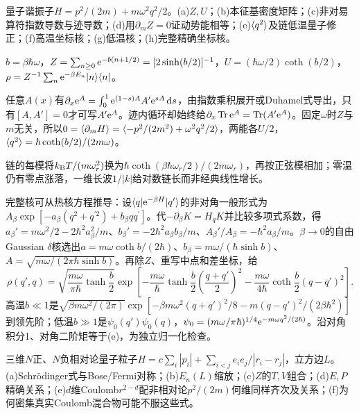 \begin{exercise}[原题8(a)--(h)]\label{r:333-3-8}
量子谐振子$H=p^2/(2m)+m\omega^2q^2/2$。(a)$Z,U$；(b)本征基密度矩阵；(c)非对易算符指数导数与迹导数；(d)用$\partial_mZ=0$证动势能相等；(e)$\langle q^2\rangle$及链低温量子修正；(f)高温坐标核；(g)低温核；(h)完整精确坐标核。
\end{exercise}
\begin{solution}
$b=\beta\hbar\omega$，$Z=\sum_{n\ge0}\mathrm e^{-b(n+1/2)}=[2\sinh(b/2)]^{-1}$，$U=(\hbar\omega/2)\coth(b/2)$，$\rho=Z^{-1}\sum_n\mathrm e^{-\beta E_n}\lvert n\rangle\langle n\rvert$。

任意$A(x)$有$\partial_x\mathrm e^A=\int_0^1\mathrm e^{(1-s)A}A'\mathrm e^{sA}\,\mathrm d s$，由指数乘积展开或Duhamel式导出，只有$[A,A']=0$才可写$A'\mathrm e^A$。迹内循环却始终给$\partial_x\operatorname{Tr}\mathrm e^A=\operatorname{Tr}(A'\mathrm e^A)$。固定$\omega$时$Z$与$m$无关，所以$0=\langle \partial_mH\rangle=\langle -p^2/(2m^2)+\omega^2q^2/2\rangle$，两能各$U/2$，$\langle q^2\rangle=\hbar\coth(b/2)/(2m\omega)$。

链的每模将$k_{\mathrm B} T/(m\omega_r^2)$换为$\hbar\coth(\beta\hbar\omega_r/2)/(2m\omega_r)$，再按正弦模相加；零温仍有零点涨落，一维长波$1/|k|$给对数链长而非经典线性增长。

完整核可从热核方程推导：设$\langle q|\mathrm e^{-\beta H}|q^\prime\rangle$的非对角一般形式为$A_\beta\exp[-a_\beta(q^2+q^{\prime2})+b_\beta qq^\prime]$。代$-\partial_\beta K=H_qK$并比较多项式系数，得$a_\beta'=m\omega^2/2-2\hbar^2a_\beta^2/m$、$b_\beta'=-2\hbar^2a_\beta b_\beta/m$、$A_\beta'/A_\beta=-\hbar^2a_\beta/m$。$\beta\to0$的自由Gaussian $\delta$核选出$a=m\omega\coth b/(2\hbar)$、$b_\beta=m\omega/(\hbar\sinh b)$、$A=\sqrt{m\omega/(2\pi\hbar\sinh b)}$。再除$Z$、重写中点和差坐标，给
\begin{equation}
\rho(q',q)=\sqrt{\frac{m\omega}{\pi\hbar}\tanh\frac b2}\exp\left[-\frac{m\omega}{\hbar}\tanh\frac b2\left(\frac{q+q'}2\right)^2-\frac{m\omega}{4\hbar}\coth\frac b2(q-q')^2\right].
\end{equation}
高温$b\ll1$是$\sqrt{\beta m\omega^2/(2\pi)}\exp[-\beta m\omega^2(q+q')^2/8-m(q-q')^2/(2\beta\hbar^2)]$到领先阶；低温$b\gg1$是$\psi_0(q')\psi_0(q)$，$\psi_0=(m\omega/\pi\hbar)^{1/4}\mathrm e^{-m\omega q^2/(2\hbar)}$。沿对角积分1、对角二阶矩等于(e)，为独立归一化检查。
\end{solution}
\begin{exercise}[原题9(a)--(f)]\label{r:333-3-9}
三维$N$正、$N$负相对论量子粒子$H=c\sum_i|p_i|+\sum_{i<j}e_ie_j/|r_i-r_j|$，立方边$L$。(a)Schrödinger式与Bose/Fermi对称；(b)$E_n(L)$缩放；(c)$Z$的$T,V$组合；(d)$E,P$精确关系；(e)$d$维Coulomb$r^{2-d}$配非相对论$p^2/(2m)$何维同样齐次及关系；(f)为何密集真实Coulomb混合物可能不服这些式。
\end{exercise}
